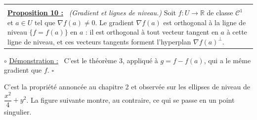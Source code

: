 \documentclass[a4paper,twoside]{report}
\makeatletter
\newenvironment{cadre}%
 {\par\vspace{2mm}\noindent\begin{tabular}{|@{\hspace{4mm}}p{0.93\textwidth}@{\hspace{4mm}}|}
  \hline \\[-2mm]}%
 {\\[2mm] \hline \end{tabular}\par\vspace{3mm}}
\newcommand{\propo}[1]{\textbf{\underline{Proposition #1 :}}~}
\newenvironment{demo}%
 {\par\needspace{4\baselineskip}\vspace{1mm}\noindent$\circ$ \underline{Démonstration :}~\setlength{\parskip}{3pt plus 1pt}}%
 {\hfill$\square$\par\vspace{2mm}}
\newcommand{\R}{\mathbb{R}}
\newcommand{\Cc}{\mathcal{C}}                     %
\newcommand{\grad}{\nabla}                        %
\makeatother
\begin{document}
\begin{cadre}
\propo{10} \emph{(Gradient et lignes de niveau.)} Soit $f : U \to \R$ de classe $\Cc^{1}$ et $a \in U$ tel que $\grad f(a) \neq 0$. Le gradient $\grad f(a)$ est orthogonal à la ligne de niveau $\{f = f(a)\}$ en $a$ : il est orthogonal à tout vecteur tangent en $a$ à cette ligne de niveau, et ces vecteurs tangents forment l'hyperplan $\grad f(a)^{\perp}$.
\end{cadre}

\begin{demo}
C'est le théorème 3, appliqué à $g = f - f(a)$, qui a le même gradient que $f$.
\end{demo}

\noindent C'est la propriété annoncée au chapitre 2 et observée sur les ellipses de niveau de $\dfrac{x^{2}}{4} + y^{2}$. La figure suivante montre, au contraire, ce qui se passe en un point singulier.
\end{document}
